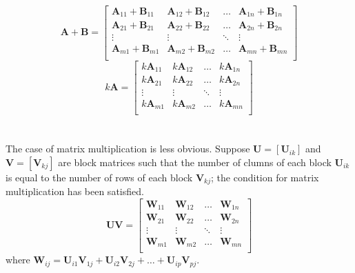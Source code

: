 \documentclass[../setup.tex]{subfiles}
\begin{document}
\[\bm{A} + \bm{B} = \begin{bmatrix}
\bm{A}_{11} + \bm{B}_{11} & \bm{A}_{12} + \bm{B}_{12} & \dots & \bm{A}_{1n} + \bm{B}_{1n} \\
\bm{A}_{21} + \bm{B}_{21} & \bm{A}_{22} + \bm{B}_{22} & \dots & \bm{A}_{2n} + \bm{B}_{2n} \\
\vdots & \vdots & \ddots & \vdots \\
\bm{A}_{m1} + \bm{B}_{m1} & \bm{A}_{m2} + \bm{B}_{m2} & \dots & \bm{A}_{mn} + \bm{B}_{mn} \\
\end{bmatrix}\]
\[k\bm{A} = \begin{bmatrix}
k\bm{A}_{11} & k\bm{A}_{12} & \dots & k\bm{A}_{1n} \\
k\bm{A}_{21} & k\bm{A}_{22} & \dots & k\bm{A}_{2n} \\
\vdots & \vdots & \ddots & \vdots \\
k\bm{A}_{m1} & k\bm{A}_{m2} & \dots & k\bm{A}_{mn} \\
\end{bmatrix}\]
\phantom \\ \\
The case of matrix multiplication is less obvious. Suppose $\bm{U} = [\bm{U}_{ik}]$ and $\bm{V} = [\bm{V}_{kj}]$ are block matrices such that the number of clumns of each block $\bm{U}_{ik}$ is equal to the number of rows of each block $\bm{V}_{kj}$; the condition for matrix multiplication has been satisfied. \\
\[\bm{UV} = \begin{bmatrix}
\bm{W}_{11} & \bm{W}_{12} & \dots & \bm{W}_{1n} \\
\bm{W}_{21} & \bm{W}_{22} & \dots & \bm{W}_{2n} \\
\vdots & \vdots & \ddots & \vdots \\
\bm{W}_{m1} & \bm{W}_{m2} & \dots & \bm{W}_{mn} \\
\end{bmatrix}\] 
where $\bm{W}_{ij} = \bm{U}_{i1}\bm{V}_{1j} + \bm{U}_{i2}\bm{V}_{2j} + \dots + \bm{U}_{ip}\bm{V}_{pj}$.
\end{document}
